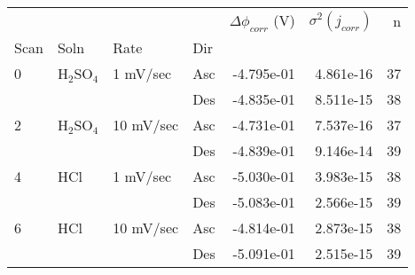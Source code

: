 \begin{tabular}{llllrrr}
\toprule
  &     &           &     &  $\Delta \phi_{corr}$ (V) &  $\sigma^2(j_{corr})$ &   n \\
Scan & Soln & Rate & Dir &                           &                       &     \\
\midrule
0 & H$_2$SO$_4$ & 1 mV/sec & Asc &                -4.795e-01 &             4.861e-16 &  37 \\
  &     &           & Des &                -4.835e-01 &             8.511e-15 &  38 \\
2 & H$_2$SO$_4$ & 10 mV/sec & Asc &                -4.731e-01 &             7.537e-16 &  37 \\
  &     &           & Des &                -4.839e-01 &             9.146e-14 &  39 \\
4 & HCl & 1 mV/sec & Asc &                -5.030e-01 &             3.983e-15 &  38 \\
  &     &           & Des &                -5.083e-01 &             2.566e-15 &  39 \\
6 & HCl & 10 mV/sec & Asc &                -4.814e-01 &             2.873e-15 &  38 \\
  &     &           & Des &                -5.091e-01 &             2.515e-15 &  39 \\
\bottomrule
\end{tabular}
